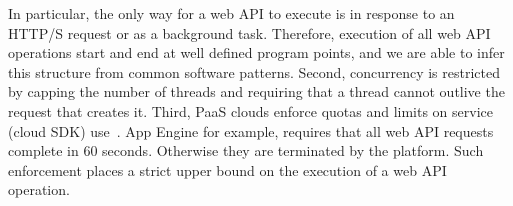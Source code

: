 In particular, the only way for a web API to execute is in response
to an HTTP/S request or as a background task.  Therefore, execution of
all web API operations start and end at well defined program points, and
we are able to infer this structure from common software patterns.  Second,
concurrency is restricted by capping the number of threads
and requiring that a thread cannot outlive the request
that creates it.  Third, PaaS clouds enforce quotas and limits on service
(cloud SDK) use~\cite{azure-limits,gae-limits,gae-sandbox}.
App Engine for example, requires that all web API requests complete in 60 seconds.
Otherwise they are terminated by the platform. 
Such enforcement places a strict upper bound on the
execution of a web API operation.